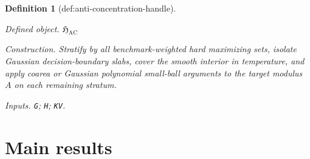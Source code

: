 \documentclass{article}
\newtheorem{definition}{Definition}
\begin{document}
\begin{definition}[def:anti-concentration-handle]\label{def:anti-concentration-handle}
\par\smallskip\noindent\emph{Defined object.} \(\mathfrak H_{\mathrm{AC}}\)
\par\smallskip\noindent\emph{Construction.} Stratify by all benchmark-weighted hard maximizing sets, isolate Gaussian decision-boundary slabs, cover the smooth interior in temperature, and apply coarea or Gaussian polynomial small-ball arguments to the target modulus \(A\) on each remaining stratum.
\par\smallskip\noindent\emph{Inputs.} \texttt{G}; \texttt{H}; \texttt{KV}.
\end{definition}

\section{Main results}
\end{document}
